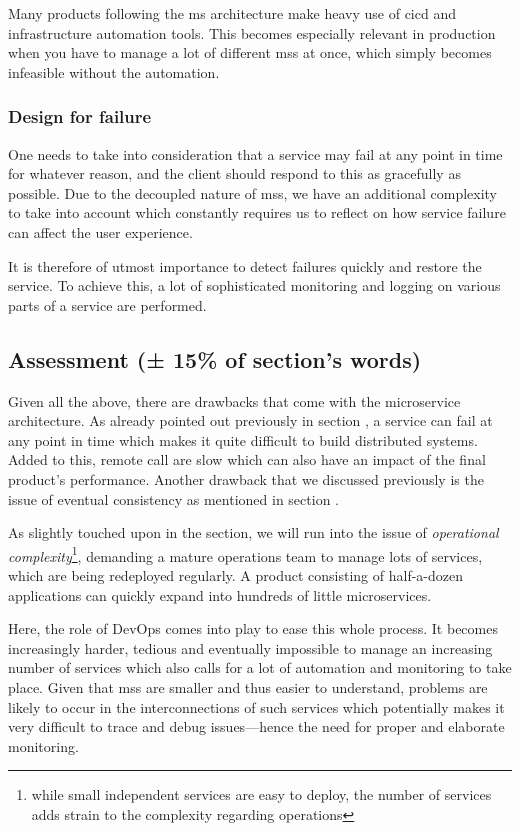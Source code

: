 Many products following the \gls{ms} architecture make heavy use of
\gls{cicd} and infrastructure automation tools. This becomes
especially relevant in production when you have to manage a lot of
different \glspl{ms} at once, which simply becomes infeasible without
the automation.

\subsubsection{Design for failure}
\label{sec:design-for-failure}

One needs to take into consideration that a service may fail at any
point in time for whatever reason, and the client should respond to
this as gracefully as possible. Due to the decoupled nature of
\glspl{ms}, we have an additional complexity to take into account
which constantly requires us to reflect on how service failure can
affect the user experience.

It is therefore of utmost importance to detect failures quickly and
restore the service. To achieve this, a lot of sophisticated
monitoring and logging on various parts of a service are performed.


\subsection{Assessment (± 15\% of section's words)}

Given all the above, there are drawbacks that come with the
microservice architecture. As already pointed out previously in
section , a service can fail at any point
in time which makes it quite difficult to build distributed systems.
Added to this, remote call are slow which can also have an impact of
the final product's performance. Another drawback that we discussed
previously is the issue of eventual consistency as mentioned in section
.

As slightly touched upon in the
 section, we will run into the
issue of \textit{operational complexity}\footnote{while small
	independent services are easy to deploy, the number of services adds
strain to the complexity regarding operations}, demanding a mature
operations team to manage lots of services, which are being redeployed
regularly. A product consisting of half-a-dozen applications can
quickly expand into hundreds of little microservices.
\cite{ms-trade-off}

Here, the role of DevOps comes into play to ease this whole process.
It becomes increasingly harder, tedious and eventually impossible to
manage an increasing number of services which also calls for a lot of
automation and monitoring to take place. Given that \glspl{ms} are
smaller and thus easier to understand, problems are likely to occur in
the interconnections of such services which potentially makes it very
difficult to trace and debug issues---hence the need for proper and
elaborate monitoring.


